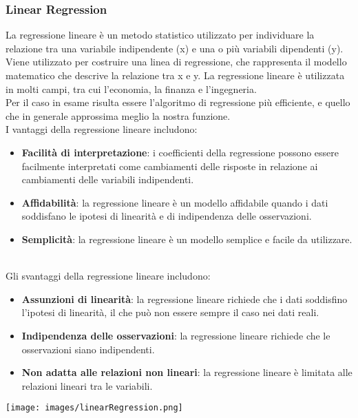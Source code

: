 \documentclass{article}
\begin{document}
        \subsubsection{Linear Regression}
        La regressione lineare è un metodo statistico utilizzato per individuare la relazione tra una variabile indipendente (x) e una o più variabili dipendenti (y). Viene utilizzato per costruire una linea di regressione, che rappresenta il modello matematico che descrive la relazione tra x e y. La regressione lineare è utilizzata in molti campi, tra cui l'economia, la finanza e l'ingegneria.\\
        Per il caso in esame risulta essere l'algoritmo di regressione più efficiente, e quello che in generale approssima meglio la nostra funzione.\newline\\
        I vantaggi della regressione lineare includono:
        \begin{itemize}
            \item \textbf{Facilità di interpretazione}: i coefficienti della regressione possono essere facilmente interpretati come cambiamenti delle risposte in relazione ai cambiamenti delle variabili indipendenti.
            \item \textbf{Affidabilità}: la regressione lineare è un modello affidabile quando i dati soddisfano le ipotesi di linearità e di indipendenza delle osservazioni.
            \item \textbf{Semplicità}: la regressione lineare è un modello semplice e facile da utilizzare.
        \end{itemize}
        \newline\\
        Gli svantaggi della regressione lineare includono:
        \begin{itemize}
            \item \textbf{Assunzioni di linearità}: la regressione lineare richiede che i dati soddisfino l'ipotesi di linearità, il che può non essere sempre il caso nei dati reali.
            \item \textbf{Indipendenza delle osservazioni}: la regressione lineare richiede che le osservazioni siano indipendenti.
            \item \textbf{Non adatta alle relazioni non lineari}: la regressione lineare è limitata alle relazioni lineari tra le variabili.
        \end{itemize}\newline
        \begin{center}
            \texttt{[image: images/linearRegression.png]}
        \end{center}
        \newpage
\end{document}
